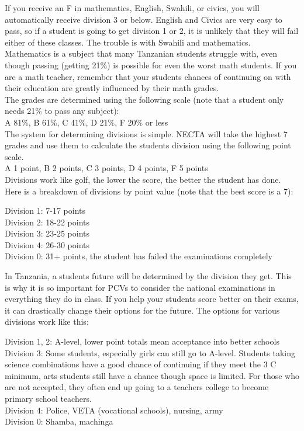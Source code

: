       If you receive an F in mathematics, English, Swahili, or civics, you will automatically receive division 3 or below.  English and Civics are very easy to pass, so if a student is going to get division 1 or 2, it is unlikely that they will fail either of these classes.  The trouble is with Swahili and mathematics.  Mathematics is a subject that many Tanzanian students struggle with, even though passing (getting 21\%) is possible for even the worst math students.  If you are a math teacher, remember that your students chances of continuing on with their education are greatly influenced by their math grades. \\
      The grades are determined using the following scale (note that a student only needs 21\% to pass any subject):\\

      A 81\%, B 61\%, C 41\%, D 21\%, F 20\% or less\\
      
      The system for determining divisions is simple.  NECTA will take the highest 7 grades and use them to calculate the students division using the following point scale. \\

      A 1 point,  B 2 points, C 3 points, D 4 points, F 5 points \\

      Divisions work like golf, the lower the score, the better the student has done.  Here is a breakdown of divisions by point value (note that the best score is a 7): \\
\begin{flushleft}
Division 1: 7-17 points\\
Division 2: 18-22 points\\
Division 3: 23-25 points\\
Division 4: 26-30 points\\
Division 0: 31+ points, the student has failed the examinations completely\\
\end{flushleft}
 
      In Tanzania, a students future will be determined by the division they get.  This is why it is so important for PCVs to consider the national examinations in everything they do in class.  If you help your students score better on their exams, it can drastically change their options for the future.  The options for various divisions work like this: \\
\begin{flushleft}
Division 1, 2: A-level, lower point totals mean acceptance into better schools\\
Division 3: Some students, especially girls can still go to A-level.  Students taking science combinations have a good chance of continuing if they meet the 3 C minimum, arts students still have a chance though space is limited.  For those who are not accepted, they often end up going to a teachers college to become primary school teachers.\\
Division 4: Police, VETA (vocational schools), nursing, army\\
Division 0: Shamba, machinga\\
\end{flushleft}

